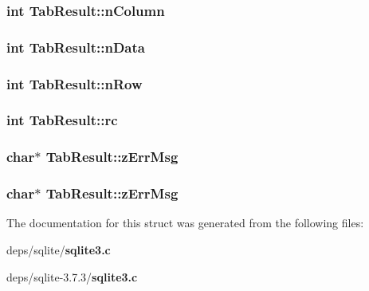 \subsubsection{\setlength{\rightskip}{0pt plus 5cm}int \bf{Tab\-Result::n\-Column}}\label{structTabResult_0ab4c02de0e735513561294719e5aac6}


\subsubsection{\setlength{\rightskip}{0pt plus 5cm}int \bf{Tab\-Result::n\-Data}}\label{structTabResult_aa6e7aac926ae9698717e0ae8f9d634f}


\subsubsection{\setlength{\rightskip}{0pt plus 5cm}int \bf{Tab\-Result::n\-Row}}\label{structTabResult_39fa4f013a9802bbb36014e94f989474}


\subsubsection{\setlength{\rightskip}{0pt plus 5cm}int \bf{Tab\-Result::rc}}\label{structTabResult_bc4a6fcf0ecd37d3a886b2804d7b44f8}


\subsubsection{\setlength{\rightskip}{0pt plus 5cm}char$\ast$ \bf{Tab\-Result::z\-Err\-Msg}}\label{structTabResult_a7f7d4da15bb86101d71f609ce0e0e82}


\subsubsection{\setlength{\rightskip}{0pt plus 5cm}char$\ast$ \bf{Tab\-Result::z\-Err\-Msg}}\label{structTabResult_a7f7d4da15bb86101d71f609ce0e0e82}




The documentation for this struct was generated from the following files:\begin{CompactItemize}
\item 
deps/sqlite/\bf{sqlite3.c}\item 
deps/sqlite-3.7.3/\bf{sqlite3.c}\end{CompactItemize}

